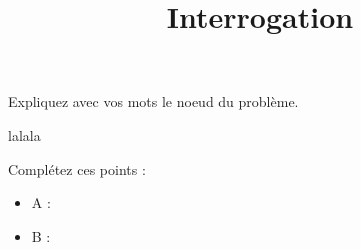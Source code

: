 \usepackage{amsmath}
\usepackage{graphicx}
\usepackage{url}
\title{Interrogation}

\maketitle

\begin{questions}
\question[1]
Expliquez avec vos mots le noeud du problème.
\begin{solutionordottedlines}[2cm]
lalala
\end{solutionordottedlines}

\question[2]
Complétez ces points :
\begin{itemize}
\item A : 
\item B : 
\end{itemize}

\end{questions}

